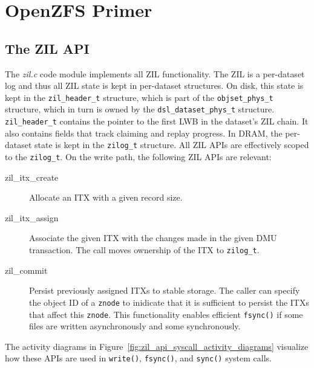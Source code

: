 \documentclass[12pt,a4paper,twoside]{book}
\begin{document}
\section{OpenZFS Primer}

\subsection{The ZIL API}\label{openzfs:the_zil_api}
The \textit{zil.c} code module implements all ZIL functionality.
The ZIL is a per-dataset log and thus all ZIL state is kept in per-dataset structures.
On disk, this state is kept in the \lstinline{zil_header_t} structure, which is part of the \lstinline{objset_phys_t} structure, which in turn is owned by the \lstinline{dsl_dataset_phys_t} structure.
\lstinline{zil_header_t} contains the pointer to the first LWB in the dataset's ZIL chain.
It also contains fields that track claiming and replay progress.
In DRAM, the per-dataset state is kept in the \lstinline{zilog_t} structure.
All ZIL APIs are effectively scoped to the \lstinline{zilog_t}. %
On the write path, the following ZIL APIs are relevant:
\begin{description}
    \item[zil\_itx\_create] Allocate an ITX with a given record size.
    \item[zil\_itx\_assign] Associate the given ITX with the changes made in the given DMU transaction.
          The call moves ownership of the ITX to \lstinline{zilog_t}.
    \item[zil\_commit] Persist previously assigned ITXs to stable storage.
          The caller can specify the object ID of a \lstinline{znode} to inidicate that it is sufficient to persist the ITXs that affect this \lstinline{znode}.
          This functionality enables efficient \lstinline{fsync()} if some files are written asynchronously and some synchronously.
\end{description}
The activity diagrams in Figure~\ref{fig:zil_api_syscall_activity_diagrams} visualize how these APIs are used in \lstinline{write()}, \lstinline{fsync()}, and \lstinline{sync()} system calls.
\end{document}
